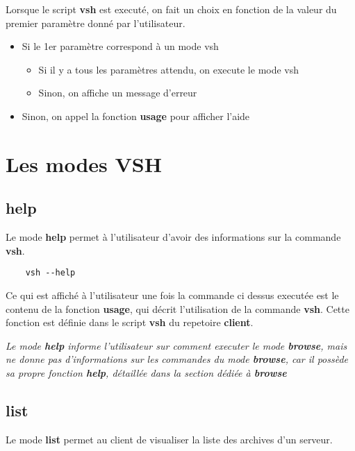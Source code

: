 \documentclass[titlepage]{article}
\begin{document}
	Lorsque le script \textbf{vsh} est executé, on fait un choix en fonction de la valeur du premier paramètre donné par l'utilisateur.

	\begin{itemize}
		\item Si le 1er paramètre correspond à un mode vsh
		\begin{itemize}
			\item Si il y a tous les paramètres attendu, on execute le mode vsh
			\item Sinon, on affiche un message d'erreur
		\end{itemize}
		\item Sinon, on appel la fonction \textbf{usage} pour afficher l'aide
	\end{itemize}

	\section{Les modes VSH}

	\subsection{help}

	Le mode \textbf{help} permet à l'utilisateur d'avoir des informations sur la commande \textbf{vsh}. 

	\begin{lstlisting}
	vsh --help
	\end{lstlisting}

	Ce qui est affiché à l'utilisateur une fois la commande ci dessus executée est le contenu de la fonction \textbf{usage}, qui décrit l'utilisation de la commande \textbf{vsh}. Cette fonction est définie dans le script \textbf{vsh} du repetoire \textbf{client}.

	\textit{Le mode \textbf{help} informe l'utilisateur sur comment executer le mode \textbf{browse}, mais ne donne pas d'informations sur les commandes du mode \textbf{browse}, car il possède sa propre fonction \textbf{help}, détaillée dans la section dédiée à \textbf{browse}}

	
	\subsection{list}

	Le mode \textbf{list} permet au client de visualiser la liste des archives d'un serveur.
\end{document}
